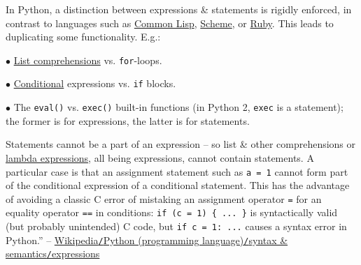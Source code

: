 \documentclass{article}
\numberwithin{equation}{section}
\begin{document}
In Python, a distinction between expressions \& statements is rigidly enforced, in contrast to languages such as \href{https://en.wikipedia.org/wiki/Common_Lisp}{Common Lisp}, \href{https://en.wikipedia.org/wiki/Scheme_(programming_language)}{Scheme}, or \href{https://en.wikipedia.org/wiki/Ruby_(programming_language)}{Ruby}. This leads to duplicating some functionality. E.g.:
\begin{enumerate*}
	\item[$\bullet$] \href{https://en.wikipedia.org/wiki/List_comprehensions}{List comprehensions} vs. \texttt{for}-loops.
	\item[$\bullet$] \href{https://en.wikipedia.org/wiki/Conditional_(programming)}{Conditional} expressions vs. \texttt{if} blocks.
	\item[$\bullet$] The \texttt{eval()} vs. \texttt{exec()} built-in functions (in Python 2, \texttt{exec} is a statement); the former is for expressions, the latter is for statements.
\end{enumerate*}

Statements cannot be a part of an expression -- so list \& other comprehensions or \href{https://en.wikipedia.org/wiki/Lambda_(programming)}{lambda expressions}, all being expressions, cannot contain statements. A particular case is that an assignment statement such as \texttt{a = 1} cannot form part of the conditional expression of a conditional statement. This has the advantage of avoiding a classic C error of mistaking an assignment operator \texttt{=} for an equality operator \texttt{==} in conditions: \verb|if (c = 1) { ... }| is syntactically valid (but probably unintended) C code, but \verb|if c = 1: ...| causes a syntax error in Python.'' -- \href{https://en.wikipedia.org/wiki/Python_(programming_language)#Expressions}{Wikipedia\texttt{/}Python (programming language)\texttt{/}syntax \& semantics\texttt{/}expressions}
\end{document}

